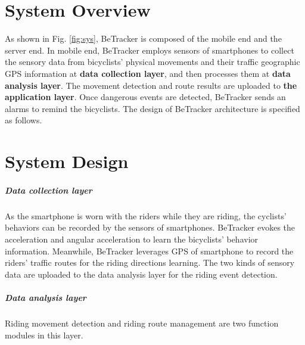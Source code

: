 \documentclass{sigchi-ext}
\def\sysname{BeTracker }
\begin{document}
\section{ System Overview}
As shown in Fig. \ref{fig:sys}, \sysname is composed of the mobile end and the server end.  In mobile end, \sysname employs sensors of smartphones to collect the sensory data from bicyclists' physical movements and their traffic geographic GPS information at \textbf{data collection layer}, and then processes them at \textbf{data analysis layer}. The movement detection and route results are uploaded to \textbf{the application layer}. Once dangerous events are detected, \sysname sends an alarms to remind the bicyclists. 
The design of \sysname architecture is specified as follows.

\section{System Design} 
\subparagraph{Data collection layer}
As the smartphone is worn with the riders while they are riding, the cyclists' behaviors can be recorded by the sensors of smartphones.  \sysname evokes the acceleration and angular acceleration to learn the bicyclists' behavior information. Meanwhile, \sysname leverages GPS of smartphone to record the riders' traffic routes for the riding directions learning. 
The two kinds of sensory data are uploaded to the data analysis layer for the riding event detection.
\subparagraph{Data analysis layer} 






Riding movement detection and riding route management are two function modules in this layer. 
\end{document}
